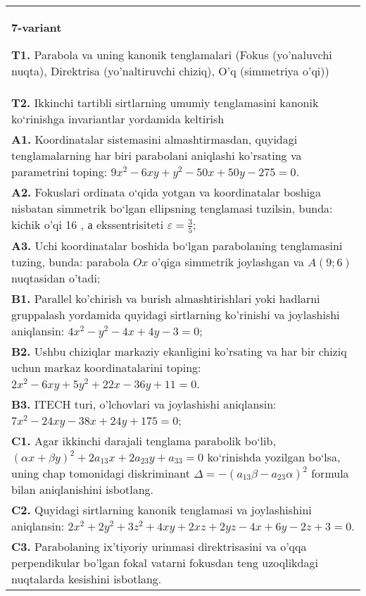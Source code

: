 \documentclass{article}
\begin{document}
\begin{tabular}{m{17cm}}
\textbf{7-variant}
\newline

\textbf{T1.} Parabola va uning kanonik tenglamalari (Fokus (yo’naluvchi nuqta), Direktrisa (yo’naltiruvchi chiziq), O’q (simmetriya o’qi)) \\
\textbf{T2.} Ikkinchi tartibli sirtlarning umumiy tenglamasini kanonik ko‘rinishga invariantlar yordamida keltirish \\
\textbf{A1.} Koordinatalar sistemasini almashtirmasdan, quyidagi tenglamalarning har biri parabolani aniqlashi ko'rsating va parametrini toping: $9 x^2-6 x y+y^2-50 x+50 y-275=0$. \\
\textbf{A2.} Fokuslari ordinata o‘qida yotgan va koordinatalar boshiga nisbatan simmetrik bo‘lgan ellipsning tenglamasi tuzilsin, bunda: kichik o'qi 16 , а ekssentrisiteti $\varepsilon=\frac{3}{5}$; \\
\textbf{A3.} Uchi koordinatalar boshida bo‘lgan parabolaning tenglamasini tuzing, bunda: parabola $Ox$ o'qiga simmetrik joylashgan va $A(9 ; 6)$ nuqtasidan o'tadi; \\
\textbf{B1.} Parallel ko'chirish va burish almashtirishlari yoki hadlarni gruppalash yordamida quyidagi sirtlarning ko'rinishi va joylashishi aniqlansin: $4 x^2-y^2-4 x+4 y-3=0$; \\
\textbf{B2.} Ushbu chiziqlar markaziy ekanligini ko'rsating va har bir chiziq uchun markaz koordinatalarini toping: $2 x^2-6 x y+5 y^2+22 x-36 y+11=0$. \\
\textbf{B3.} ITECH turi, o'lchovlari va joylashishi aniqlansin: $7 x^2-24 x y-38 x+24 y+175=0$; \\
\textbf{C1.} Agar ikkinchi darajali tenglama parabolik bo‘lib, $ (\alpha x+\beta y) ^2+2a_{13}x+2a_{23}y+a_{33}=0$ ko‘rinishda yozilgan bo‘lsa, uning chap tomonidagi diskriminant $\Delta=- (a_{13} \beta-a_{23} \alpha) ^2$ formula bilan aniqlanishini isbotlang. \\
\textbf{C2.} Quyidagi sirtlarning kanonik tenglamasi va joylashishini aniqlansin: $2 x^2+2 y^2+3 z^2+4 x y+2 x z+2 y z-4 x+6 y-2 z+3=0$. \\
\textbf{C3.} Parabolaning ix'tiyoriy urinmasi direktrisasini va o'qqa perpendikular bo'lgan fokal vatarni fokusdan teng uzoqlikdagi nuqtalarda kesishini isbotlang. \\

\end{tabular}
\vspace{1cm}
\end{document}

